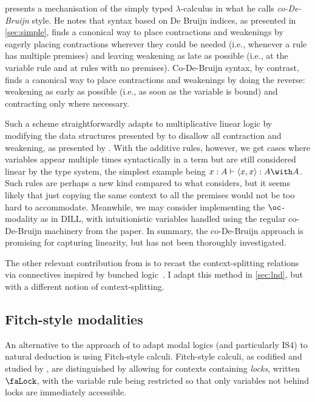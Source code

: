  presents a mechanisation of the simply typed
$\lambda$-calculus in what he calls \emph{co-De-Bruijn} style.
He notes that syntax based on De Bruijn indices, as presented in
\cref{sec:simple}, finds a canonical way to place contractions and weakenings
by eagerly placing contractions wherever they could be needed (i.e., whenever a
rule has multiple premises) and leaving weakening as late as possible (i.e., at
the variable rule and at rules with no premises).
Co-De-Bruijn syntax, by contrast, finds a canonical way to place contractions
and weakenings by doing the reverse: weakening as early as possible (i.e., as
soon as the variable is bound) and contracting only where necessary.

Such a scheme straightforwardly adapts to multiplicative linear logic by
modifying the data structures presented by \citet{McBride18} to disallow all
contraction and weakening, as presented by \citet{RPKV20}.
With the additive rules, however, we get cases where variables appear multiple
times syntactically in a term but are still considered linear by the type
system, the simplest example being
$x : A \vdash \langle x, x\rangle : A \with A$.
Such rules are perhaps a new kind compared to what \citeauthor{McBride18}
considers, but it seems likely that just copying the same context to all the
premises would not be too hard to accommodate.
Meanwhile, we may consider implementing the $\oc$-modality as in DILL, with
intuitionistic variables handled using the regular co-De-Bruijn machinery from
the paper.
In summary, the co-De-Bruijn approach is promising for capturing linearity, but
has not been thoroughly investigated.

The other relevant contribution from \citet{RPKV20} is to recast the
context-splitting relations via connectives inspired by bunched
logic~\citep{oHP99}.
I adapt this method in \cref{sec:lnd}, but with a different notion of
context-splitting.

\subsection{Fitch-style modalities}\label{sec:fitch}

An alternative to the approach of \citet{judgmental} to adapt modal logics (and
particularly IS4) to natural deduction is using Fitch-style calculi.
Fitch-style calculi, as codified and studied by \citet{Borghuis-thesis}, are
distinguished by allowing for contexts containing \emph{locks}, written $\Lock$,
with the variable rule being restricted so that only variables not behind locks
are immediately accessible.

